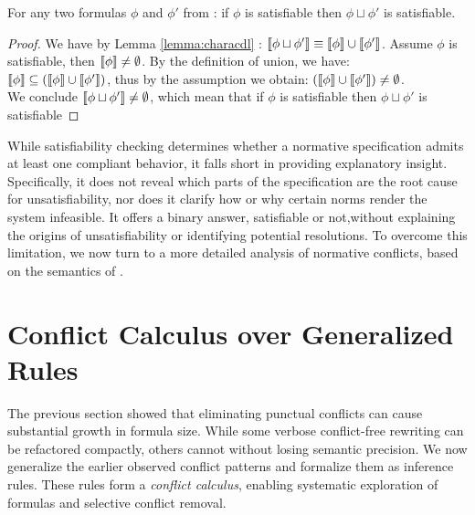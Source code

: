 \begin{lemma}\label{disjunctionissat} 
For any two formulas $\phi$ and $\phi'$ from \TDDLfm: if $\phi$ is satisfiable then $\phi \sqcup \phi'$ is satisfiable.
\end{lemma}
\begin{proof}
We have by Lemma \ref{lemma:characdl} : $\llbracket \phi \sqcup \phi' \rrbracket\equiv \llbracket \phi \rrbracket \cup \llbracket \phi' \rrbracket$.
Assume $\phi$ is satisfiable, then $\llbracket \phi \rrbracket\neq \emptyset$.
By the definition of union, we have:\\
$\llbracket \phi \rrbracket \subseteq (\llbracket \phi \rrbracket \cup \llbracket \phi' \rrbracket)$, thus by the assumption we obtain: $(\llbracket \phi \rrbracket \cup \llbracket \phi' \rrbracket)\neq \emptyset$.\\
 We conclude $\llbracket \phi \sqcup \phi' \rrbracket \neq \emptyset$, which mean that if $\phi$ is satisfiable then $\phi \sqcup \phi'$ is satisfiable
\end{proof}



While satisfiability checking determines whether a normative specification admits at least one compliant behavior, it falls short in providing explanatory insight. Specifically, it does not reveal which parts of the specification are the root cause for unsatisfiability, nor does it clarify how or why certain norms render the system infeasible. It offers a binary answer, satisfiable or not,without explaining the origins of unsatisfiability or identifying potential resolutions. To overcome this limitation, we now turn to a more detailed analysis of normative conflicts, based on the semantics of \TDDLfm.






 


		

\section{Conflict Calculus over Generalized Rules}\label{subsec:calculus}

The previous section showed that eliminating punctual conflicts can cause substantial growth in formula size.  
While some verbose conflict-free rewriting can be refactored compactly, others cannot without losing semantic precision.  
We now generalize the earlier observed conflict patterns and formalize them as inference rules.  
These rules form a \emph{conflict calculus}, enabling systematic exploration of formulas and selective conflict removal.

